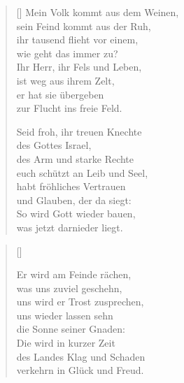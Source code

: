 \begin{multicols}{2}
\begin{verse}[\versewidth]
 Mein Volk kommt aus dem Weinen,\\
sein Feind kommt aus der Ruh,\\
ihr tausend flieht vor einem,\\
wie geht das immer zu?\\
Ihr Herr, ihr Fels und Leben,\\
ist weg aus ihrem Zelt,\\
er hat sie übergeben\\
zur Flucht ins freie Feld.

 Seid froh, ihr treuen Knechte\\
des Gottes Israel,\\
des Arm und starke Rechte\\
euch schützt an Leib und Seel,\\
habt fröhliches Vertrauen\\
und Glauben, der da siegt:\\
So wird Gott wieder bauen,\\
was jetzt darnieder liegt.

\end{verse}
\end{multicols}

\begin{center}
\settowidth{\versewidth}{Der, vor dem die Welt erschrickt,}
\begin{verse}[\versewidth]

 Er wird am Feinde rächen,\\
was uns zuviel geschehn,\\
uns wird er Trost zusprechen,\\
uns wieder lassen sehn\\
die Sonne seiner Gnaden:\\
Die wird in kurzer Zeit\\
des Landes Klag und Schaden\\
verkehrn in Glück und Freud.

\end{verse}
\end{center}

